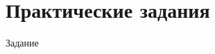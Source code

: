 \chapter{Практические задания}

Задание


\begin{lstlisting}

\end{lstlisting}



\begin{lstlisting}

\end{lstlisting}
